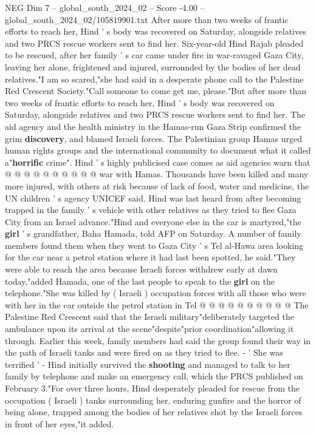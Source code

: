 \begin{textsample}{NEG Dim 7 – global\_south\_2024\_02 – Score -4.00 – global\_south\_2024\_02/105819901.txt}  \label{ex:f7_neg_398}
After more than two weeks of frantic efforts to reach her, Hind ' s body was recovered on Saturday, alongside relatives and two PRCS rescue workers sent to find her.
Six-year-old Hind Rajab pleaded to be rescued, after her family ' s car came under fire in war-ravaged Gaza City, leaving her alone, frightened and injured, surrounded by the bodies of her dead relatives."I am so scared,"she had said in a desperate phone call to the Palestine Red Crescent Society."Call someone to come get me, please."But after more than two weeks of frantic efforts to reach her, Hind ' s body was recovered on Saturday, alongside relatives and two PRCS rescue workers sent to find her.
The aid agency and the health ministry in the Hamas-run Gaza Strip confirmed the grim \textbf{discovery}, and blamed Israeli forces.
The Palestinian group Hamas urged human rights groups and the international community to document what it called a"\textbf{horrific} crime".
Hind ' s highly publicised case comes as aid agencies warn that @ @ @ @ @ @ @ @ @ @ war with Hamas.
Thousands have been killed and many more injured, with others at risk because of lack of food, water and medicine, the UN children ' s agency UNICEF said.
Hind was last heard from after becoming trapped in the family ' s vehicle with other relatives as they tried to flee Gaza City from an Israel advance."Hind and everyone else in the car is martyred,"the \textbf{girl} ' s grandfather, Baha Hamada, told AFP on Saturday.
A number of family members found them when they went to Gaza City ' s Tel al-Hawa area looking for the car near a petrol station where it had last been spotted, he said."They were able to reach the area because Israeli forces withdrew early at dawn today,"added Hamada, one of the last people to speak to the \textbf{girl} on the telephone."She was killed by ( Israeli ) occupation forces with all those who were with her in the car outside the petrol station in Tel @ @ @ @ @ @ @ @ @ @ The Palestine Red Crescent said that the Israeli military"deliberately targeted the ambulance upon its arrival at the scene"despite"prior coordination"allowing it through.
Earlier this week, family members had said the group found their way in the path of Israeli tanks and were fired on as they tried to flee. - ' She was terrified ' - Hind initially survived the \textbf{shooting} and managed to talk to her family by telephone and make an emergency call, which the PRCS published on February 3."For over three hours, Hind desperately pleaded for rescue from the occupation ( Israeli ) tanks surrounding her, enduring gunfire and the horror of being alone, trapped among the bodies of her relatives shot by the Israeli forces in front of her eyes,"it added.

\end{textsample}
